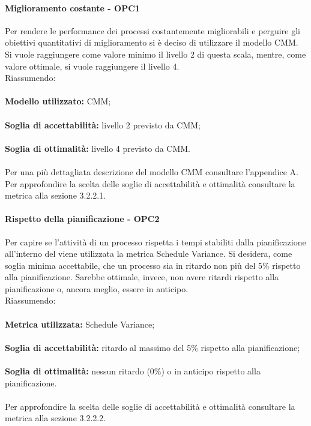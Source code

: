 \documentclass[PianoDiQualifica.tex]{subfiles}
\begin{document}
			\paragraph{Miglioramento costante - OPC1}
			Per rendere le performance dei processi costantemente migliorabili e perguire gli obiettivi quantitativi di miglioramento si è deciso di utilizzare il modello CMM.
			Si vuole raggiungere come valore minimo il livello 2 di questa scala, mentre, come valore ottimale, si vuole raggiungere il livello 4. \\
			Riassumendo: \\ \\
			\textbf{Modello utilizzato:} CMM; \\ \\
			\textbf{Soglia di accettabilità:} livello 2 previsto da CMM; \\ \\
			\textbf{Soglia di ottimalità:} livello 4 previsto da CMM. \\ \\
			Per una più dettagliata descrizione del modello CMM consultare l'appendice A. \\
			Per approfondire la scelta delle soglie di accettabilità e ottimalità consultare la metrica alla sezione 3.2.2.1.	
			
			\paragraph{Rispetto della pianificazione - OPC2}
			Per capire se l'attività di un processo rispetta i tempi stabiliti dalla pianificazione all'interno del \PPdocRR{} viene utilizzata la metrica Schedule Variance.
			Si desidera, come soglia minima accettabile, che un processo sia in ritardo non più del 5\% rispetto alla pianificazione. Sarebbe ottimale, invece, non avere ritardi
			rispetto alla pianificazione o, ancora meglio, essere in anticipo.\\
			Riassumendo: \\ \\
			\textbf{Metrica utilizzata:} Schedule Variance; \\ \\
			\textbf{Soglia di accettabilità:} ritardo al massimo del 5\% rispetto alla pianificazione; \\ \\
			\textbf{Soglia di ottimalità:} nessun ritardo (0\%) o in anticipo rispetto alla pianificazione. \\ \\
			Per approfondire la scelta delle soglie di accettabilità e ottimalità consultare la metrica alla sezione 3.2.2.2.	
			
\end{document}

